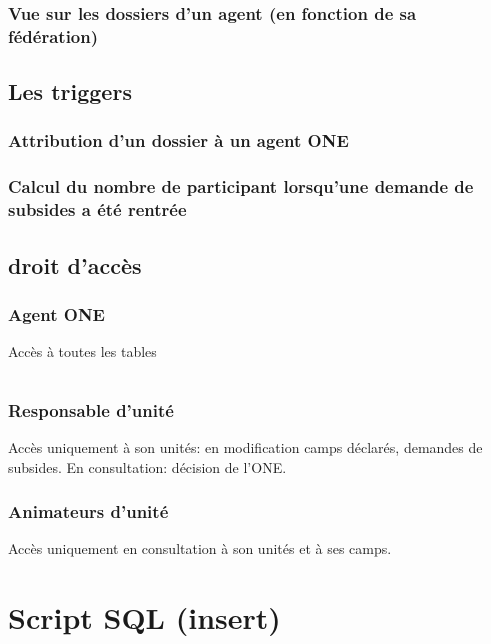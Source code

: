 \subsubsection{Vue sur les dossiers d'un agent (en fonction de sa fédération)}








\subsection{Les triggers}
\subsubsection{Attribution d'un dossier à un agent ONE}

\subsubsection{Calcul du nombre de participant lorsqu'une demande de subsides a été rentrée}




\subsection{droit d'accès}
\subsubsection{Agent ONE}
Accès à toutes les tables
\inputminted[breaklines =true, autogobble, linenos, frame = single]{sql}{Codes/code_role_agent_one.tex}



\subsubsection{Responsable d'unité}
Accès uniquement à son unités: en modification camps déclarés, demandes de subsides. En consultation: décision de l'ONE. 



\subsubsection{Animateurs d'unité}
Accès uniquement en consultation à son unités et à ses camps. 










\section{Script SQL (insert)}
